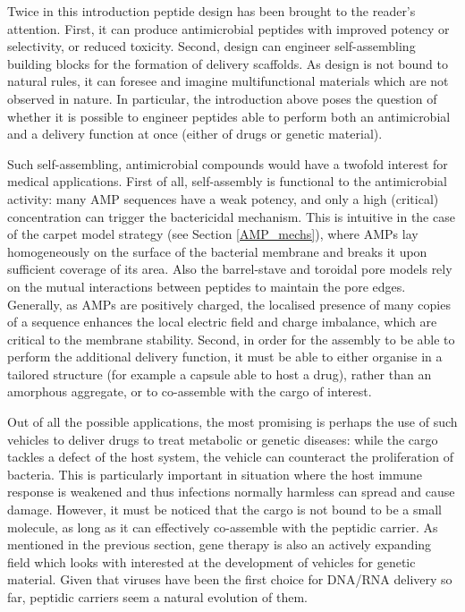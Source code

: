 Twice in this introduction peptide design has been brought to the reader's attention. First, it can produce antimicrobial peptides with improved potency or selectivity, or reduced toxicity. Second,  design can engineer self-assembling building blocks for the formation of delivery scaffolds. As design is not bound to natural rules, it can foresee and imagine multifunctional materials which are not observed in nature. In particular, the introduction above poses the question of whether it is possible to engineer peptides able to perform both an antimicrobial and a delivery function at once (either of drugs or genetic material).

Such self-assembling, antimicrobial compounds would have a twofold interest for medical applications.
%
First of all, self-assembly is functional to the antimicrobial activity: many AMP sequences have a weak potency, and only a high (critical) concentration can trigger the bactericidal mechanism. This is intuitive in the case of the carpet model strategy (see Section \ref{AMP_mechs}), where AMPs lay homogeneously on the surface of the bacterial membrane and breaks it upon sufficient coverage of its area. Also the barrel-stave and toroidal pore models rely on the mutual interactions between peptides to maintain the pore edges.
%
Generally, as AMPs are positively charged, the localised presence of many copies of a sequence enhances the local electric field and charge imbalance, which are critical to the membrane stability. 
%
Second, in order for the assembly to be able to perform the additional delivery function, it must be able to either organise in a tailored structure (for example a capsule able to host a drug), rather than an amorphous aggregate, or to co-assemble with the cargo of interest.

Out of all the possible applications, the most promising is perhaps the use of such vehicles to deliver drugs to treat metabolic or genetic diseases: while the cargo tackles a defect of the host system, the vehicle can counteract the proliferation of bacteria. This is particularly important in situation where the host immune response is weakened and thus infections normally harmless can spread and cause damage.
%
However, it must be noticed that the cargo is not bound to be a small molecule, as long as it can effectively co-assemble with the peptidic carrier. As mentioned in the previous section, gene therapy is also an actively expanding field which looks with interested at the development of vehicles for genetic material. Given that viruses have been the first choice for DNA/RNA delivery so far, peptidic carriers seem a natural evolution of them.

